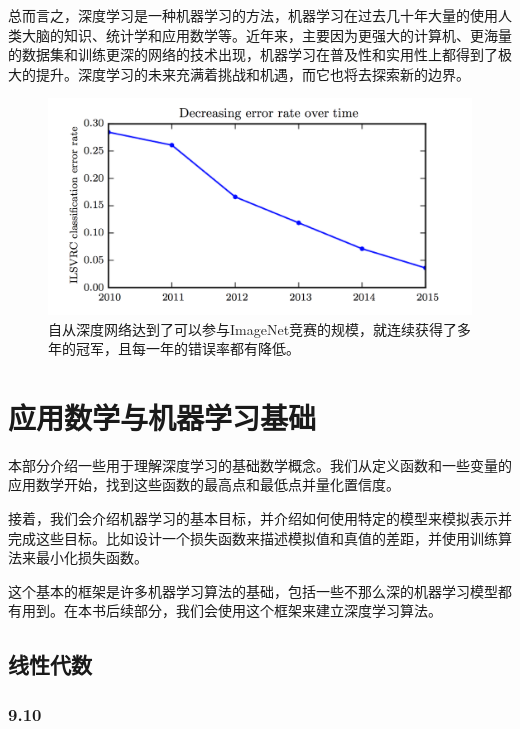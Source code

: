 \documentclass[a4paper,11pt]{book}
\begin{document}
总而言之，深度学习是一种机器学习的方法，机器学习在过去几十年大量的使用人类大脑的知识、统计学和应用数学等。近年来，主要因为更强大的计算机、更海量的数据集和训练更深的网络的技术出现，机器学习在普及性和实用性上都得到了极大的提升。深度学习的未来充满着挑战和机遇，而它也将去探索新的边界。

   

	

\begin{figure}[htbp] %
   \centering
   \includegraphics[width=6in]{fig/chap1/1.12.png} 
   \caption{自从深度网络达到了可以参与ImageNet竞赛的规模，就连续获得了多年的冠军，且每一年的错误率都有降低。}
   \label{fig:1.12}
\end{figure}


\part{应用数学与机器学习基础}
\label{part:1}

本部分介绍一些用于理解深度学习的基础数学概念。我们从定义函数和一些变量的应用数学开始，找到这些函数的最高点和最低点并量化置信度。


接着，我们会介绍机器学习的基本目标，并介绍如何使用特定的模型来模拟表示并完成这些目标。比如设计一个损失函数来描述模拟值和真值的差距，并使用训练算法来最小化损失函数。


这个基本的框架是许多机器学习算法的基础，包括一些不那么深的机器学习模型都有用到。在本书后续部分，我们会使用这个框架来建立深度学习算法。

\chapter{线性代数}
\label{chap:2}


\section{9.10}
\label{sec:9.10}
\end{document}
